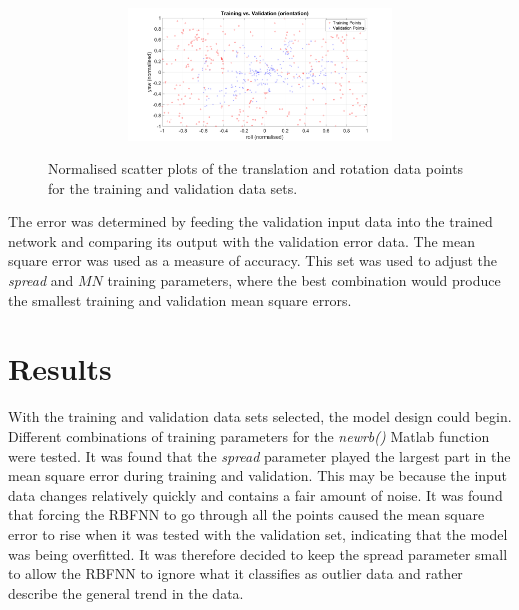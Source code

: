 \begin{figure}
\begin{subfigure}{\textwidth}
\begin{subfigure}{0.48\textwidth}
    \end{subfigure}
    \begin{subfigure}{0.48\textwidth}
      \includegraphics[clip, trim = 100 0 100 20, width=\textwidth]{figures/chapter4/tr_v_v_pos_rollyaw}
    \end{subfigure}
    \caption{}
  \end{subfigure}
  \caption[Scatter plots of the training and validation data. ]{Normalised scatter plots of the translation and rotation data points for the training and validation data sets. }
  \label{fig:chap4-scatter-tr-v}
\end{figure}

The error was determined by feeding the validation input data into the trained network and comparing its output with the validation error data. The mean square error was used as a measure of accuracy. This set was used to adjust the \emph{spread} and $\mathit{MN}$ training parameters, where the best combination would produce the smallest training and validation mean square errors. 

\section{Results}

With the training and validation data sets selected, the model design could begin. Different combinations of training parameters for the \emph{newrb()} Matlab function were tested. It was found that the \emph{spread} parameter played the largest part in the mean square error during training and validation. This may be because the input data changes relatively quickly and contains a fair amount of noise. It was found that forcing the RBFNN to go through all the points caused the mean square error to rise when it was tested with the validation set, indicating that the model was being overfitted. It was therefore decided to keep the spread parameter small to allow the RBFNN to ignore what it classifies as outlier data and rather describe the general trend in the data. 


